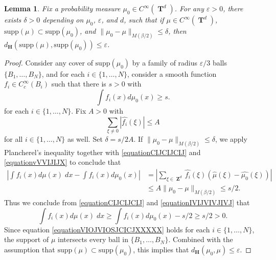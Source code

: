 \documentclass[12pt,reqno]{article}
\numberwithin{equation}{section}
\DeclareMathOperator{\ZZ}{\mathbf{Z}}
\DeclareMathOperator{\TT}{\mathbf{T}}
\newtheorem{lemma}[theorem]{Lemma}
\numberwithin{theorem}{section}
\begin{document}
\begin{lemma} \label{LemmaTAOIAWOIDJ12301}
    Fix a probability measure $\mu_0 \in C^\infty(\TT^d)$. For any $\varepsilon > 0$, there exists $\delta > 0$ depending on $\mu_0$, $\varepsilon$, and $d$, such that if $\mu \in C^\infty(\TT^d)$, $\text{supp}(\mu) \subset \text{supp}(\mu_0)$, and $\| \mu_0 - \mu \|_{M(\beta/2)} \leq \delta$, then $d_\mathbf{H}(\text{supp}(\mu),\text{supp}(\mu_0)) \leq \varepsilon$.
\end{lemma}
\begin{proof}
    Consider any cover of $\text{supp}(\mu_0)$ by a family of radius $\varepsilon/3$ balls $\{ B_1,\dots,B_N \}$, and for each $i \in \{ 1, \dots, N \}$, consider a smooth function $f_i \in C_c^\infty(B_i)$ such that there is $s > 0$ with
    \begin{equation} \label{equationCIJCIJCIJ}
        \int f_i(x) d\mu_0(x) \geq s.
    \end{equation}
    for each $i \in \{ 1, \dots, N \}$. Fix $A > 0$ with
    \begin{equation} \label{equationvVVIJIJX}
        \sum_{\xi \neq 0} |\widehat{f_i}(\xi)| \leq A
    \end{equation}
    for all $i \in \{ 1, \dots, N \}$ as well. Set $\delta = s/2A$. If $\| \mu_0 - \mu \|_{M(\beta/2)} \leq \delta$, we apply Plancherel's inequality together with \eqref{equationCIJCIJCIJ} and \eqref{equationvVVIJIJX} to conclude that
    \begin{equation} \label{equationIVIJVIVJIVJ}
    \begin{split}
        \left| \int f_i(x) d\mu(x)\; dx - \int f_i(x) d\mu_0(x) \right| &= \left| \sum_{\xi \in \ZZ^d} \widehat{f_i}(\xi) \left( \widehat{\mu}(\xi) - \widehat{\mu_0}(\xi) \right) \right|\\
        &\leq A \| \mu_0 - \mu \|_{M(\beta/2)} \leq s/2.
    \end{split}
    \end{equation}
    Thus we conclude from \eqref{equationCIJCIJCIJ} and \eqref{equationIVIJVIVJIVJ} that
    \begin{equation} \label{equationVIOJVIOSJCICJXXXXX}
        \int f_i(x) d\mu(x)\; dx \geq \int f_i(x) d\mu_0(x) - s/2 \geq s/2 > 0.
    \end{equation}
    Since equation \eqref{equationVIOJVIOSJCICJXXXXX} holds for each $i \in \{ 1,\dots, N \}$, the support of $\mu$ intersects every ball in $\{ B_1, \dots, B_N \}$. Combined with the assumption that $\text{supp}(\mu) \subset \text{supp}(\mu_0)$, this implies that $d_\mathbf{H}(\mu_0,\mu) \leq \varepsilon$.
\end{proof}
\end{document}
